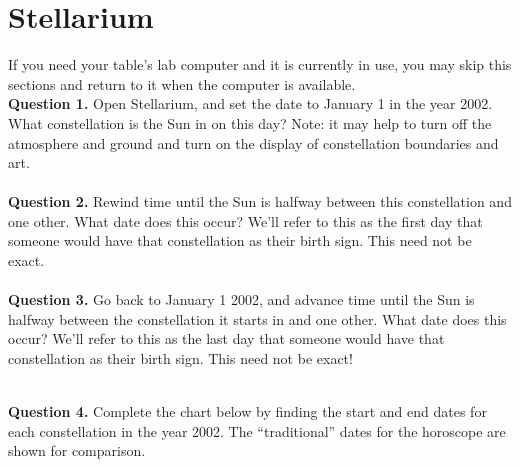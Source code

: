 \documentclass[11pt]{article}
\begin{document}

\newpage
\section{Stellarium}
If you need your table's lab computer and it is currently in use, you may skip this sections and return to it when the computer is available.\\

\textbf{Question 1.} Open Stellarium, and set the date to January 1 in the year 2002. What constellation is the Sun in on this day? Note: it may help to turn off the atmosphere and ground and turn on the display of constellation boundaries and art.\\

\vspace{1.5cm}
\hrulefill\\

\textbf{Question 2.} Rewind time until the Sun is halfway between this constellation and one other. What date does this occur? We'll refer to this as the first day that someone would have that constellation as their birth sign. This need not be exact.\\

\vspace{1.5cm}
\hrulefill\\

\textbf{Question 3.} Go back to January 1 2002, and advance time until the Sun is halfway between the constellation it starts in and one other. What date does this occur? We'll refer to this as the last day that someone would have that constellation as their birth sign. This need not be exact!\\

\vspace{1.5cm}
\hrulefill\\

\newpage

\textbf{Question 4.} Complete the chart below by finding the start and end dates for each constellation in the year 2002. The ``traditional'' dates for the horoscope are shown for comparison.\\
\end{document}
